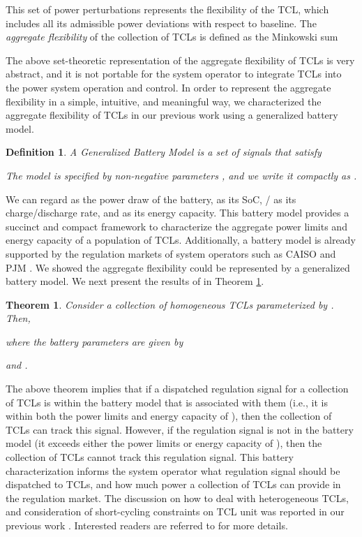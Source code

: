 \documentclass[onecolumn,journal]{IEEEtran}
\newtheorem{theorem}{Theorem}
\newtheorem{definition}{Definition}
\begin{document}
This set of power perturbations represents the flexibility of the  TCL, which includes all its admissible power deviations with respect to baseline.
The \emph{aggregate flexibility}  of the collection of TCLs is defined as the Minkowski sum


The above set-theoretic representation of the aggregate flexibility of \acp{TCL} is very abstract, and it is not portable for the system operator to integrate \acp{TCL} into the power system operation and control. In order to represent the aggregate flexibility  in a simple, intuitive, and meaningful way, we characterized the aggregate flexibility of TCLs in our previous work \cite{hehao2013generalized, HH_BS_KP_TV_TPS_2013} using a generalized battery model. 
\begin{definition}
A \emph{Generalized Battery Model}  is a set of signals  that satisfy
 
The model is specified by non-negative parameters ,  and we write it compactly as . 
\label{def:battery}
\end{definition}

We can regard  as the power draw of the battery,  as its SoC, / as its charge/discharge rate, and  as its energy capacity. This battery model provides a succinct and compact framework to characterize the aggregate power limits and energy capacity of a population of \acp{TCL}.  Additionally, a battery model is already supported by the regulation markets of system operators such as \ac{CAISO} and \ac{PJM} \cite{CAISO_storage, PJM_storage}. We showed the aggregate flexibility  could be represented by a generalized battery model. We next present the results of \cite{hehao2013generalized, HH_BS_KP_TV_TPS_2013} in Theorem \ref{thm:main_results}.

\begin{theorem}\label{thm:main_results}
Consider a collection of  \emph{homogeneous} \acp{TCL} parameterized by .  Then, 
 
where the battery parameters are given by

and . 
\end{theorem}

The above theorem implies that if a dispatched regulation signal for a collection of \acp{TCL} is within the  battery model that is associated with them (i.e., it is within both the power limits and energy capacity of ), then the collection of \acp{TCL} can track this signal. However, if the regulation signal is not in the battery model (it exceeds either the power limits or energy capacity of ), then the collection of TCLs cannot track this regulation signal. This battery characterization informs the system operator what regulation signal should be dispatched to \acp{TCL}, and how much power a collection of \acp{TCL} can provide in the regulation market.  The discussion on how to deal with heterogeneous \acp{TCL}, and consideration of short-cycling constraints on \ac{TCL} unit was reported in our previous work \cite{BS_HH_KP_TV_ACC:2013}. Interested readers are referred to \cite{BS_HH_KP_TV_ACC:2013} for more details.
\end{document}
